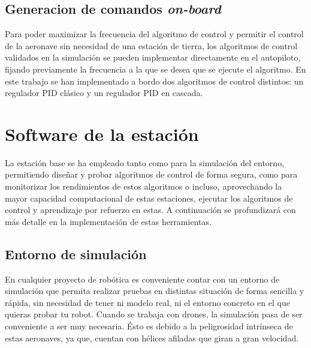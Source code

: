 \subsection{Generacion de comandos \textit{on-board}}
	Para poder maximizar la frecuencia del algoritmo de control y permitir el control de la aeronave sin necesidad de una estación de tierra, los algoritmos de control validados en la simulación se pueden implementar directamente en el autopiloto, fijando previamente la frecuencia a la que se desea que se ejecute el algoritmo. 
	En este trabajo se han implementado a bordo dos algoritmos de control distintos: un regulador PID clásico y un regulador PID en cascada.
	
\section{Software de la estación}

La estación base se ha empleado tanto como para la simulación del entorno, permitiendo diseñar y probar algoritmos de control de forma segura, como para monitorizar los rendimientos de estos algoritmos o incluso, aprovechando la mayor capacidad computacional de estas estaciones, ejecutar los algoritmos de control y aprendizaje por refuerzo en estas.
A continuación se profundizará con más detalle en la implementación de estas herramientas. 


\subsection{Entorno de simulación}

En cualquier proyecto de robótica es conveniente contar con un entorno de simulación que permita realizar pruebas en distintas situación de forma sencilla y rápida, sin necesidad de tener ni modelo real, ni el entorno concreto en el que quieras probar tu robot. Cuando se trabaja con drones, la simulación pasa de ser conveniente a ser muy necesaria. Ésto es debido a la peligrosidad intrínseca de estas aeronaves, ya que, cuentan con hélices afiladas que giran a gran velocidad.


